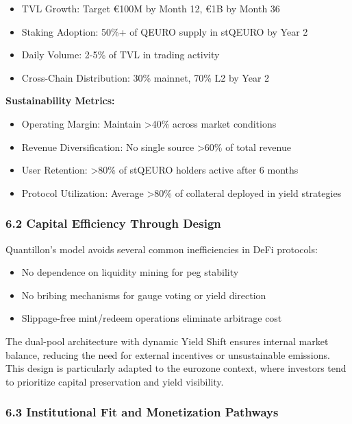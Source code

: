 \begin{itemize}
\item
  TVL Growth: Target €100M by Month 12, €1B by Month 36
\item
  Staking Adoption: 50\%+ of QEURO supply in stQEURO by Year 2
\item
  Daily Volume: 2-5\% of TVL in trading activity
\item
  Cross-Chain Distribution: 30\% mainnet, 70\% L2 by Year 2
\end{itemize}

\textbf{Sustainability Metrics:}

\begin{itemize}
\item
  Operating Margin: Maintain \textgreater40\% across market conditions
\item
  Revenue Diversification: No single source \textgreater60\% of total
  revenue
\item
  User Retention: \textgreater80\% of stQEURO holders active after 6
  months
\item
  Protocol Utilization: Average \textgreater80\% of collateral deployed
  in yield strategies
\end{itemize}

\hypertarget{capital-efficiency-through-design}{%
\subsubsection{6.2 Capital Efficiency Through
Design}\label{capital-efficiency-through-design}}

Quantillon's model avoids several common inefficiencies in DeFi
protocols:

\begin{itemize}
\item
  No dependence on liquidity mining for peg stability
\item
  No bribing mechanisms for gauge voting or yield direction
\item
  Slippage-free mint/redeem operations eliminate arbitrage cost
\end{itemize}

The dual-pool architecture with dynamic Yield Shift ensures internal
market balance, reducing the need for external incentives or
unsustainable emissions. This design is particularly adapted to the
eurozone context, where investors tend to prioritize capital
preservation and yield visibility.

\hypertarget{institutional-fit-and-monetization-pathways}{%
\subsubsection{6.3 Institutional Fit and Monetization
Pathways}\label{institutional-fit-and-monetization-pathways}}

